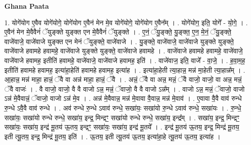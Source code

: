 \documentclass[17pt]{extarticle}
\begin{document}
\textbf{Ghana Paata } \newline

1. योगे॑योग ए॒वैव योगे॑योगे॒ योगे॑योग ए॒वैन॑ मेन मे॒व योगे॑योगे॒ योगे॑योग ए॒वैन᳚म् । . योगे॑योग॒ इति॒ योगे᳚ - यो॒गे॒ । . ए॒वैन॑ मेन मे॒वैवैनं॑ ॅयुङ्क्ते युङ्क्त एन मे॒वैवैनं॑ ॅयुङ्क्ते । . ए॒नं॒ ॅयु॒ङ्क्ते॒ यु॒ङ्क्त॒ ए॒न॒ मे॒नं॒ ॅयु॒ङ्क्ते॒ वाजे॑वाजे॒ वाजे॑वाजे युङ्क्त एन मेनं ॅयुङ्क्ते॒ वाजे॑वाजे । . यु॒ङ्क्ते॒ वाजे॑वाजे॒ वाजे॑वाजे युङ्क्ते युङ्क्ते॒ वाजे॑वाजे हवामहे हवामहे॒ वाजे॑वाजे युङ्क्ते युङ्क्ते॒ वाजे॑वाजे हवामहे । . वाजे॑वाजे हवामहे हवामहे॒ वाजे॑वाजे॒ वाजे॑वाजे हवामह॒ इतीति॑ हवामहे॒ वाजे॑वाजे॒ वाजे॑वाजे हवामह॒ इति॑ । . वाजे॑वाज॒ इति॒ वाजे᳚ - वा॒जे॒ । . ह॒वा॒म॒ह॒ इतीति॑ हवामहे हवामह॒ इत्या॑हा॒हेति॑ हवामहे हवामह॒ इत्या॑ह । . इत्या॑हा॒हेती त्या॒हान्न॒ मन्न॑ मा॒हेती त्या॒हान्न᳚म् । . आ॒हान्न॒ मन्न॑ माहा॒ हान्नं॒ ॅवै वा अन्न॑ माहा॒ हान्नं॒ ॅवै । . अन्नं॒ ॅवै वा अन्न॒ मन्नं॒ ॅवै वाजो॒ वाजो॒ वा अन्न॒ मन्नं॒ ॅवै वाजः॑ । . वै वाजो॒ वाजो॒ वै वै वाजो ऽन्न॒ मन्नं॒ ॅवाजो॒ वै वै वाजो ऽन्न᳚म् । . वाजो ऽन्न॒ मन्नं॒ ॅवाजो॒ वाजो ऽन्न॑ मे॒वैवान्नं॒ ॅवाजो॒ वाजो ऽन्न॑ मे॒व । . अन्न॑ मे॒वैवान्न॒ मन्न॑ मे॒वावा वै॒वान्न॒ मन्न॑ मे॒वाव॑ । . ए॒वावा वै॒वै वाव॑ रुन्धे रु॒न्धे ऽवै॒वै वाव॑ रुन्धे । . अव॑ रुन्धे रु॒न्धे ऽवाव॑ रुन्धे॒ सखा॑यः॒ सखा॑यो रु॒न्धे ऽवाव॑ रुन्धे॒ सखा॑यः । . रु॒न्धे॒ सखा॑यः॒ सखा॑यो रुन्धे रुन्धे॒ सखा॑य॒ इन्द्र॒ मिन्द्रꣳ॒॒ सखा॑यो रुन्धे रुन्धे॒ सखा॑य॒ इन्द्र᳚म् । . सखा॑य॒ इन्द्र॒ मिन्द्रꣳ॒॒ सखा॑यः॒ सखा॑य॒ इन्द्र॑ मू॒तय॑ ऊ॒तय॒ इन्द्रꣳ॒॒ सखा॑यः॒ सखा॑य॒ इन्द्र॑ मू॒तये᳚ । . इन्द्र॑ मू॒तय॑ ऊ॒तय॒ इन्द्र॒ मिन्द्र॑ मू॒तय॒ इती त्यू॒तय॒ इन्द्र॒ मिन्द्र॑ मू॒तय॒ इति॑ । . ऊ॒तय॒ इती त्यू॒तय॑ ऊ॒तय॒ इत्या॑हा॒हे त्यू॒तय॑ ऊ॒तय॒ इत्या॑ह । \newline
\end{document}
